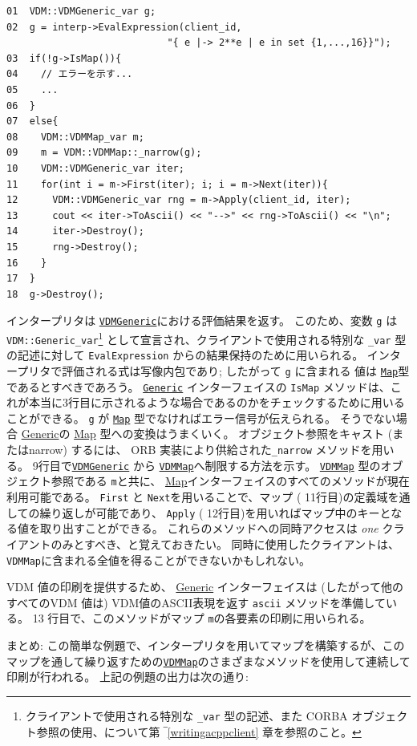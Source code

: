 \documentclass[\pformat,12pt]{jarticle}
\newcommand{\Generic}{\hyperlink{interface.Generic}{Generic}}
\newcommand{\VDMGeneric}{\hyperlink{interface.Generic}{VDMGeneric}}
\newcommand{\VDMMap}{\hyperlink{interface.VDMMap}{VDMMap}}
\newcommand{\Map}{\hyperlink{interface.VDMMap}{Map}}
\begin{document}
\begin{verbatim}
01  VDM::VDMGeneric_var g;
02  g = interp->EvalExpression(client_id, 
                            "{ e |-> 2**e | e in set {1,...,16}}");
03  if(!g->IsMap()){
04    // エラーを示す...
05    ...
06  }
07  else{
08    VDM::VDMMap_var m;
09    m = VDM::VDMMap::_narrow(g);
10    VDM::VDMGeneric_var iter;
11    for(int i = m->First(iter); i; i = m->Next(iter)){
12      VDM::VDMGeneric_var rng = m->Apply(client_id, iter);
13      cout << iter->ToAscii() << "-->" << rng->ToAscii() << "\n"; 
14      iter->Destroy();
15      rng->Destroy();
16    }
17  }
18  g->Destroy();
\end{verbatim}

インタープリタは {\tt  \VDMGeneric}における評価結果を返す。
このため、変数 {\tt g} は {\tt  VDM::Generic\_var}\footnote{クライアントで使用される特別な {\tt \_var} 型の記述、また CORBA オブジェクト参照の使用、について第 ‾\ref{writingacppclient} 章を参照のこと。} として宣言され、クライアントで使用される特別な {\tt \_var} 型の記述に対して {\tt EvalExpression} からの結果保持のために用いられる。 
インタープリタで評価される式は写像内包であり; したがって {\tt g} に含まれる
値は  {\tt \Map}型であるとすべきであろう。
 {\tt \Generic} インターフェイスの {\tt IsMap} メソッドは、これが本当に3行目に示されるような場合であるのかをチェックするために用いることができる。
 {\tt g} が {\tt \Map} 型でなければエラー信号が伝えられる。
そうでない場合 {\Generic}の {\Map} 型への変換はうまくいく。
オブジェクト参照をキャスト (またはnarrow) するには、 ORB 実装により供給された{\tt \_narrow} メソッドを用いる。 
 9行目で{\tt \VDMGeneric} から {\tt \VDMMap}へ制限する方法を示す。
{\tt \VDMMap} 型のオブジェクト参照である {\tt m}と共に、 {\Map}インターフェイスのすべてのメソッドが現在利用可能である。
{\tt First} と {\tt Next}を用いることで、マップ ( 11行目)の定義域を通しての繰り返しが可能であり、 {\tt Apply} ( 12行目)を用いればマップ中のキーとなる値を取り出すことができる。
これらのメソッドへの同時アクセスは \emph{one} クライアントのみとすべき、と覚えておきたい。
同時に使用したクライアントは、 {\tt VDMMap}に含まれる全値を得ることができないかもしれない。

VDM 値の印刷を提供するため、 {\Generic} インターフェイスは (したがって他のすべてのVDM 値は) VDM値のASCII表現を返す {\tt ascii} メソッドを準備している。
13 行目で、このメソッドがマップ {\tt m}の各要素の印刷に用いられる。

まとめ: この簡単な例題で、インタープリタを用いてマップを構築するが、このマップを通して繰り返すための{\tt \VDMMap}のさまざまなメソッドを使用して連続して印刷が行われる。
上記の例題の出力は次の通り: 
\end{document}

